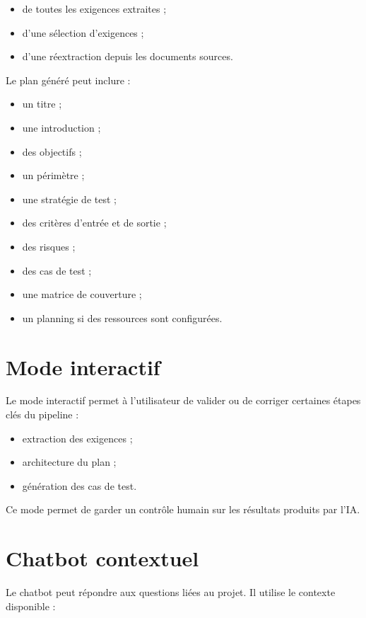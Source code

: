 \documentclass[
  french,
]{report}
\providecommand{\tightlist}{%
  \setlength{\itemsep}{0pt}\setlength{\parskip}{0pt}}
\begin{document}
\begin{itemize}
\tightlist
\item
  de toutes les exigences extraites ;
\item
  d'une sélection d'exigences ;
\item
  d'une réextraction depuis les documents sources.
\end{itemize}

Le plan généré peut inclure :

\begin{itemize}
\tightlist
\item
  un titre ;
\item
  une introduction ;
\item
  des objectifs ;
\item
  un périmètre ;
\item
  une stratégie de test ;
\item
  des critères d'entrée et de sortie ;
\item
  des risques ;
\item
  des cas de test ;
\item
  une matrice de couverture ;
\item
  un planning si des ressources sont configurées.
\end{itemize}

\section{Mode interactif}\label{mode-interactif}

Le mode interactif permet à l'utilisateur de valider ou de corriger
certaines étapes clés du pipeline :

\begin{itemize}
\tightlist
\item
  extraction des exigences ;
\item
  architecture du plan ;
\item
  génération des cas de test.
\end{itemize}

Ce mode permet de garder un contrôle humain sur les résultats produits
par l'IA.

\section{Chatbot contextuel}\label{chatbot-contextuel}

Le chatbot peut répondre aux questions liées au projet. Il utilise le
contexte disponible :
\end{document}
